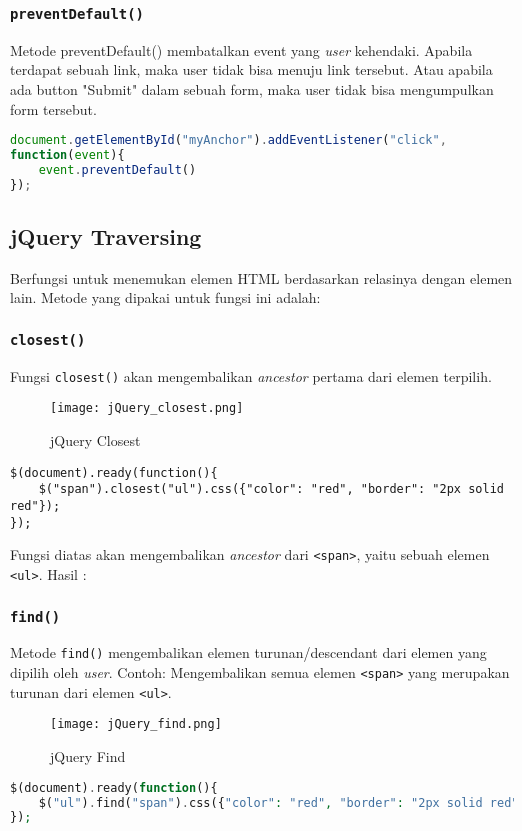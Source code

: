 \subsubsection{\texttt{preventDefault()}}
Metode preventDefault() membatalkan event yang \textit{user} kehendaki. Apabila terdapat sebuah link, maka user tidak bisa menuju link tersebut. Atau apabila ada button "Submit" dalam sebuah form, maka user tidak bisa mengumpulkan form tersebut.
\begin{lstlisting}[frame=single, language=javascript]
document.getElementById("myAnchor").addEventListener("click", 
function(event){
	event.preventDefault()
});
\end{lstlisting}


\subsection{jQuery Traversing}
Berfungsi untuk menemukan elemen HTML berdasarkan relasinya dengan elemen lain. Metode yang dipakai untuk fungsi ini adalah:
\subsubsection{\texttt{closest()}}
Fungsi \texttt{closest()} akan mengembalikan \textit{ancestor} pertama dari elemen terpilih.
\begin{figure} [H]
	\centering  
	\texttt{[image: jQuery\_closest.png]}  
	\caption{jQuery Closest} 
\end{figure}
\begin{lstlisting}[frame=single, language=jquery, breaklines=true]
$(document).ready(function(){
	$("span").closest("ul").css({"color": "red", "border": "2px solid red"});
});
\end{lstlisting}

Fungsi diatas akan mengembalikan \textit{ancestor} dari \texttt{<span>}, yaitu sebuah elemen \texttt{<ul>}.
Hasil :

\subsubsection{\texttt{find()}}
Metode \texttt{find()} mengembalikan elemen turunan/descendant dari elemen yang dipilih oleh \textit{user}.
Contoh: Mengembalikan semua elemen \texttt{<span>} yang merupakan turunan dari elemen \texttt{<ul>}.
\begin{figure} [H]
	\centering  
	\texttt{[image: jQuery\_find.png]}  
	\caption{jQuery Find} 
\end{figure}
\begin{lstlisting}[frame=single,language=PHP, breaklines=true]
$(document).ready(function(){
	$("ul").find("span").css({"color": "red", "border": "2px solid red"});
});
\end{lstlisting}


